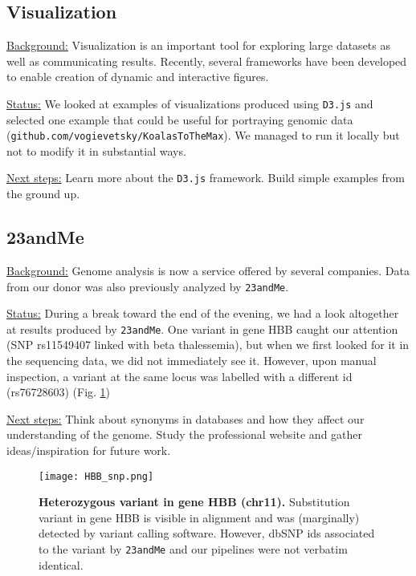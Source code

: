 \documentclass[a4paper,11pt]{TKnotes}
\newcommand{\background}{\vspace*{0.3cm}\noindent\uline{Background:} }
\newcommand{\status}{\vspace*{0.3cm}\noindent\uline{Status:} }
\newcommand{\nextsteps}{\vspace*{0.3cm}\noindent\uline{Next steps:} }
\begin{document}
\subsection{Visualization}

\background Visualization is an important tool for exploring large datasets as well as communicating results. Recently, several frameworks have been developed to enable creation of dynamic and interactive figures.

\status We looked at examples of visualizations produced using {\tt D3.js} and selected one example that could be useful for portraying genomic data ({\tt github.com/vogievetsky/KoalasToTheMax}). We managed to run it locally but not to modify it in substantial ways. 

\nextsteps Learn more about the {\tt D3.js} framework. Build simple examples from the ground up.



\vspace*{0.5cm}
\subsection{23andMe}

\background Genome analysis is now a service offered by several companies. Data from our donor was also previously analyzed by {\tt 23andMe}. 

\status During a break toward the end of the evening, we had a look altogether at results produced by {\tt 23andMe}. One variant in gene HBB caught our attention (SNP rs11549407 linked with beta thalessemia), but when we first looked for it in the sequencing data, we did not immediately see it. However, upon manual inspection, a variant at the same locus was labelled with a different id (rs76728603) (Fig. \ref{HBB})

\nextsteps Think about synonyms in databases and how they affect our understanding of the genome. Study the professional website and gather ideas/inspiration for future work.

\begin{figure}[!htb] 
\vspace*{0.2cm}
  \begin{center}
\texttt{[image: HBB\_snp.png]} \vspace*{0.4cm} 
\vspace*{-1cm}
  \end{center}
  \caption{\label{HBB}{\bf Heterozygous variant in gene HBB (chr11). } Substitution variant in gene HBB is visible in alignment and was (marginally) detected by variant calling software. However, dbSNP ids associated to the variant by {\tt 23andMe} and our pipelines were not verbatim identical. }
\end{figure}
\end{document}
